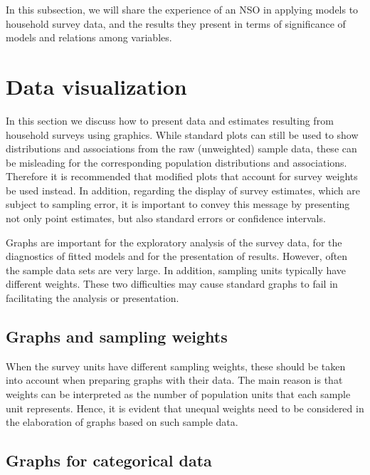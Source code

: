 \documentclass[
  12pt,
]{book}
\begin{document}
In this subsection, we will share the experience of an NSO in applying models to household survey data, and the results they present in terms of significance of models and relations among variables.

\hypertarget{data-visualization}{%
\chapter{Data visualization}\label{data-visualization}}

In this section we discuss how to present data and estimates resulting from household surveys using graphics. While standard plots can still be used to show distributions and associations from the raw (unweighted) sample data, these can be misleading for the corresponding population distributions and associations. Therefore it is recommended that modified plots that account for survey weights be used instead. In addition, regarding the display of survey estimates, which are subject to sampling error, it is important to convey this message by presenting not only point estimates, but also standard errors or confidence intervals.

Graphs are important for the exploratory analysis of the survey data, for the diagnostics of fitted models and for the presentation of results. However, often the sample data sets are very large. In addition, sampling units typically have different weights. These two difficulties may cause standard graphs to fail in facilitating the analysis or presentation.

\hypertarget{graphs-and-sampling-weights}{%
\section{Graphs and sampling weights}\label{graphs-and-sampling-weights}}

When the survey units have different sampling weights, these should be taken into account when preparing graphs with their data. The main reason is that weights can be interpreted as the number of population units that each sample unit represents. Hence, it is evident that unequal weights need to be considered in the elaboration of graphs based on such sample data.

\hypertarget{graphs-for-categorical-data}{%
\section{Graphs for categorical data}\label{graphs-for-categorical-data}}
\end{document}
